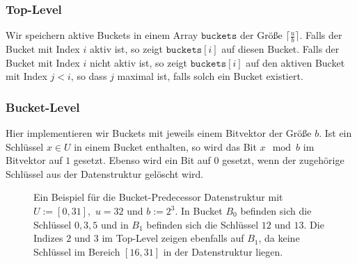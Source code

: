 \subsubsection{Top-Level}

Wir speichern aktive Buckets in einem Array $\texttt{buckets}$ der Größe $\lceil \tfrac{u}{b} \rceil$. Falls der Bucket mit Index $i$ aktiv ist, so zeigt $\texttt{buckets}[i]$ auf diesen Bucket. Falls der Bucket mit Index $i$ nicht aktiv ist, so zeigt $\texttt{buckets}[i]$ auf den aktiven Bucket mit Index $j < i$, so dass $j$ maximal ist, falls solch ein Bucket existiert.

\subsubsection{Bucket-Level}

Hier implementieren wir Buckets mit jeweils einem Bitvektor der Größe $b$. Ist ein Schlüssel $x \in U$ in einem Bucket enthalten, so wird das Bit $x \mod b$ im Bitvektor auf $1$ gesetzt. Ebenso wird ein Bit auf $0$ gesetzt, wenn der zugehörige Schlüssel aus der Datenstruktur gelöscht wird.

\begin{figure}
	\centering
	\caption{Ein Beispiel für die Bucket-Predecessor Datenstruktur mit $U := [0, 31],$ $u = 32$ und $b := 2^3$. In Bucket $B_0$ befinden sich die Schlüssel $0, 3, 5$ und in $B_1$ befinden sich die Schlüssel $12$ und $13$. Die Indizes $2$ und $3$ im Top-Level zeigen ebenfalls auf $B_1$, da keine Schlüssel im Bereich $[16, 31]$ in der Datenstruktur liegen.}
	\label{bucketpred}
\end{figure}


